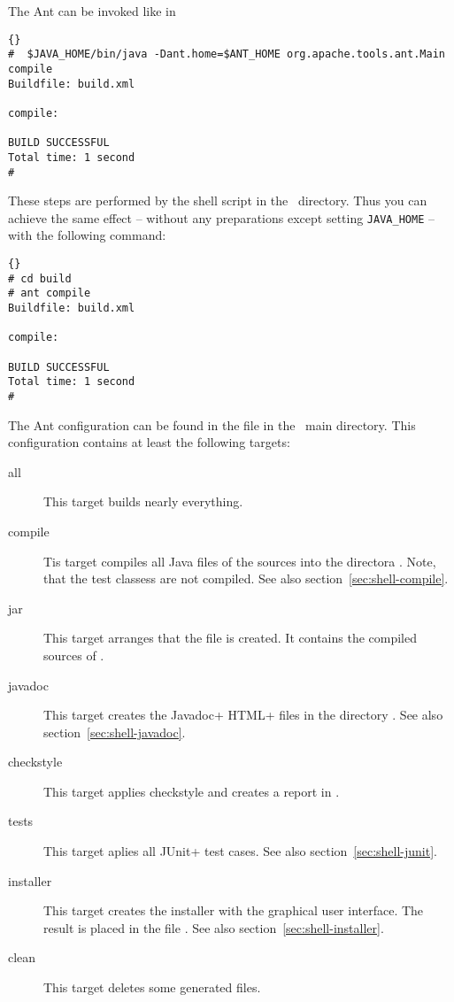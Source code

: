 The Ant can be invoked like in

\begin{lstlisting}{}
#  $JAVA_HOME/bin/java -Dant.home=$ANT_HOME org.apache.tools.ant.Main compile
Buildfile: build.xml

compile:

BUILD SUCCESSFUL
Total time: 1 second
#
\end{lstlisting}

These steps are performed by the shell script  in the
\ExTeX\ directory. Thus you can achieve the same effect -- without any
preparations except setting \verb|JAVA_HOME| -- with the following command:

\begin{lstlisting}{}
# cd build
# ant compile
Buildfile: build.xml

compile:

BUILD SUCCESSFUL
Total time: 1 second
#
\end{lstlisting}

The Ant configuration can be found in the file  in the
\ExTeX\ main directory. This configuration contains at least the
following targets:

\begin{description}
\item [all] This target builds nearly everything.
\item [compile] Tis target compiles all Java files of the sources into
  the directora . Note, that the test classess
  are not compiled. See also section~\ref{sec:shell-compile}.
\item [jar] This target arranges that the file 
  is created. It contains the compiled sources of  \ExTeX.
\item [javadoc] This target creates the \+Javadoc+ \+HTML+ files in
  the directory . See also
  section~\ref{sec:shell-javadoc}.
\item [checkstyle] This target applies checkstyle and creates a report
  in .
\item [tests] This target aplies all \+JUnit+ test cases. See also
  section~\ref{sec:shell-junit}.
\item [installer] This target creates the installer with the graphical
  user interface. The result is placed in the file
  . See also
  section~\ref{sec:shell-installer}.
\item [clean] This target deletes some generated files.
\end{description}


